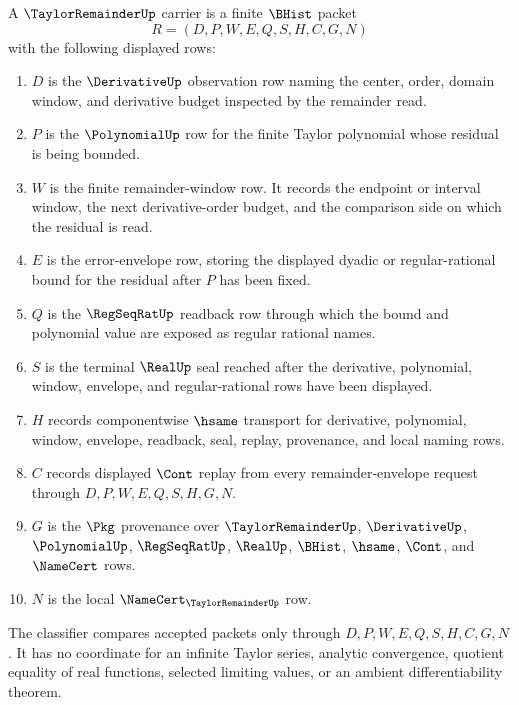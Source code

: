 \begin{definition}
\label{def:taylor-remainder-carrier}
A $\TaylorRemainderUp$ carrier is a finite $\BHist$ packet
$$
R=(D,P,W,E,Q,S,H,C,G,N)
$$
with the following displayed rows:
\begin{enumerate}
\item $D$ is the $\DerivativeUp$ observation row naming the center, order, domain window, and derivative budget inspected by the remainder read.
\item $P$ is the $\PolynomialUp$ row for the finite Taylor polynomial whose residual is being bounded.
\item $W$ is the finite remainder-window row. It records the endpoint or interval window, the next derivative-order budget, and the comparison side on which the residual is read.
\item $E$ is the error-envelope row, storing the displayed dyadic or regular-rational bound for the residual after $P$ has been fixed.
\item $Q$ is the $\RegSeqRatUp$ readback row through which the bound and polynomial value are exposed as regular rational names.
\item $S$ is the terminal $\RealUp$ seal reached after the derivative, polynomial, window, envelope, and regular-rational rows have been displayed.
\item $H$ records componentwise $\hsame$ transport for derivative, polynomial, window, envelope, readback, seal, replay, provenance, and local naming rows.
\item $C$ records displayed $\Cont$ replay from every remainder-envelope request through $D,P,W,E,Q,S,H,G,N$.
\item $G$ is the $\Pkg$ provenance over $\TaylorRemainderUp$, $\DerivativeUp$, $\PolynomialUp$, $\RegSeqRatUp$, $\RealUp$, $\BHist$, $\hsame$, $\Cont$, and $\NameCert$ rows.
\item $N$ is the local $\NameCert_{\TaylorRemainderUp}$ row.
\end{enumerate}
The classifier compares accepted packets only through $D,P,W,E,Q,S,H,C,G,N$. It has no coordinate for an infinite Taylor series, analytic convergence, quotient equality of real functions, selected limiting values, or an ambient differentiability theorem.
\end{definition}


